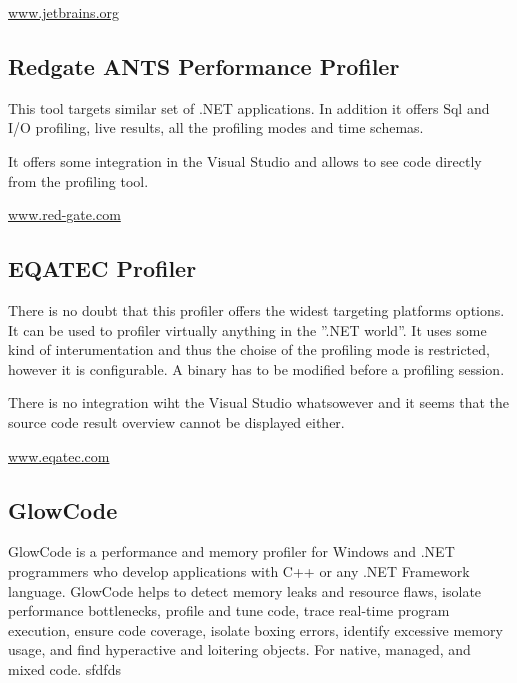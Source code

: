 \href{http://www.jetbrains.org}{www.jetbrains.org}

\subsection{Redgate ANTS Performance Profiler}
This tool targets similar set of .NET applications. In addition it offers Sql and I/O  profiling, live results, all the profiling modes and time schemas. 

It offers some integration in the Visual Studio and allows to see code directly from the profiling tool. 

\href{http://www.red-gate.com}{www.red-gate.com}

\subsection{EQATEC Profiler}
There is no doubt that this profiler offers the widest targeting platforms options. It can be used to profiler virtually anything in the ''.NET world''. It uses some kind of interumentation and thus the choise of the profiling mode is restricted, however it is configurable. A binary has to be modified before a profiling session.

There is no integration wiht the Visual Studio whatsowever and it seems that the source code result overview cannot be displayed either.

\href{http://www.eqatec.com}{www.eqatec.com}

\subsection{GlowCode}
GlowCode is a performance and memory profiler for Windows and .NET programmers who develop applications with C++ or any .NET Framework language. GlowCode helps to detect memory leaks and resource flaws, isolate performance bottlenecks, profile and tune code, trace real-time program execution, ensure code coverage, isolate boxing errors, identify excessive memory usage, and find hyperactive and loitering objects. For native, managed, and mixed code. \cite{Doeaaa} sfdfds 

